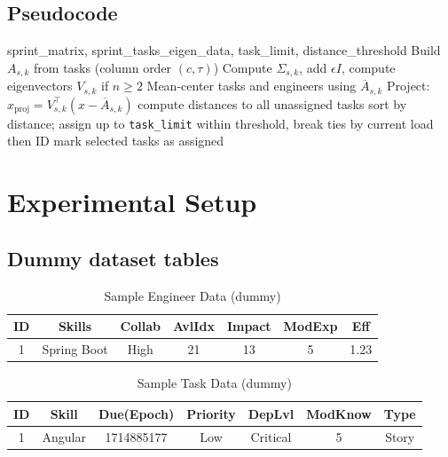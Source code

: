 \documentclass[journal]{IEEEtran}
\begin{document}
\subsection{Pseudocode}
\begin{algorithm}[H]
\caption{Sprint-level projection and assignment}
\label{alg:assign}
\begin{algorithmic}[1]
\Require sprint\_matrix, sprint\_tasks\_eigen\_data, task\_limit, distance\_threshold
    \State Build $A_{s,k}$ from tasks (column order $(c,\tau)$)
    \State Compute $\Sigma_{s,k}$, add $\epsilon I$, compute eigenvectors $V_{s,k}$ if $n\ge2$
    \State Mean-center tasks and engineers using $\overline{A}_{s,k}$
    \State Project: $x_{\text{proj}} = V_{s,k}^\top (x - \overline{A}_{s,k})$
      \State compute distances to all unassigned tasks
      \State sort by distance; assign up to \texttt{task\_limit} within threshold, break ties by current load then ID
      \State mark selected tasks as assigned
    \EndFor
  \EndFor
\EndFor
\end{algorithmic}
\end{algorithm}

\section{Experimental Setup}\label{sec:exp}

\subsection{Dummy dataset tables}
\begin{table}[H]
    \centering
    \caption{Sample Engineer Data (dummy)}
    \label{tab:engineers}
    \begin{tabular}{ccccccc}
    \toprule
    ID & Skills & Collab & AvlIdx & Impact & ModExp & Eff \\
    \midrule
    1 & Spring Boot & High & 21 & 13 & 5 & 1.23 \\
    \bottomrule
    \end{tabular}
\end{table}

\begin{table}[H]
    \centering
    \caption{Sample Task Data (dummy)}
    \label{tab:tasks}
    \begin{tabular}{ccccccc}
    \toprule
    ID & Skill & Due(Epoch) & Priority & DepLvl & ModKnow & Type \\
    \midrule
    1 & Angular & 1714885177 & Low & Critical & 5 & Story \\
    \bottomrule
    \end{tabular}
\end{table}
\end{document}
